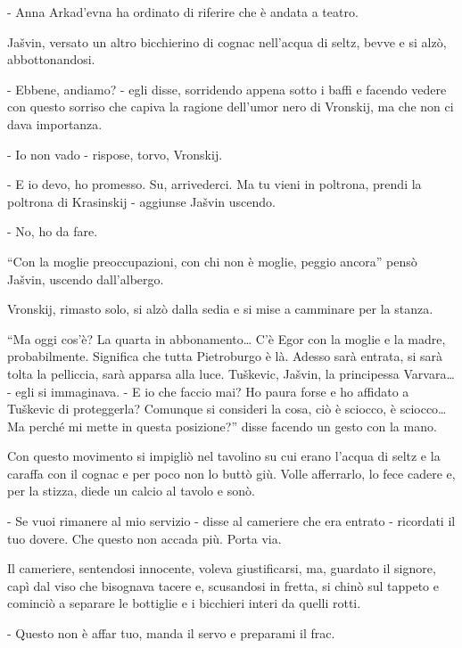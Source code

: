 - Anna Arkad'evna ha ordinato di riferire che è andata a teatro. 

Jašvin, versato un altro bicchierino di cognac nell'acqua di seltz, bevve e si alzò, abbottonandosi. 

- Ebbene, andiamo? - egli disse, sorridendo appena sotto i baffi e facendo vedere con questo sorriso che capiva la ragione dell'umor nero di Vronskij, ma che non ci dava importanza. 

- Io non vado - rispose, torvo, Vronskij. 

- E io devo, ho promesso. Su, arrivederci. Ma tu vieni in poltrona, prendi la poltrona di Krasinskij - aggiunse Jašvin uscendo. 

- No, ho da fare. 

``Con la moglie preoccupazioni, con chi non è moglie, peggio ancora'' pensò Jašvin, uscendo dall'albergo. 

Vronskij, rimasto solo, si alzò dalla sedia e si mise a camminare per la stanza. 

``Ma oggi cos'è? La quarta in abbonamento\ldots{} C'è Egor con la moglie e la madre, probabilmente. Significa che tutta Pietroburgo è là. Adesso sarà entrata, si sarà tolta la pelliccia, sarà apparsa alla luce. Tuškevic, Jašvin, la principessa Varvara\ldots{} - egli si immaginava. - E io che faccio mai? Ho paura forse e ho affidato a Tuškevic di proteggerla? Comunque si consideri la cosa, ciò è sciocco, è sciocco\ldots{} Ma perché mi mette in questa posizione?'' disse facendo un gesto con la mano. 

Con questo movimento si impigliò nel tavolino su cui erano l'acqua di seltz e la caraffa con il cognac e per poco non lo buttò giù. Volle afferrarlo, lo fece cadere e, per la stizza, diede un calcio al tavolo e sonò. 

- Se vuoi rimanere al mio servizio - disse al cameriere che era entrato - ricordati il tuo dovere. Che questo non accada più. Porta via. 

Il cameriere, sentendosi innocente, voleva giustificarsi, ma, guardato il signore, capì dal viso che bisognava tacere e, scusandosi in fretta, si chinò sul tappeto e cominciò a separare le bottiglie e i bicchieri interi da quelli rotti. 

- Questo non è affar tuo, manda il servo e preparami il frac. 

